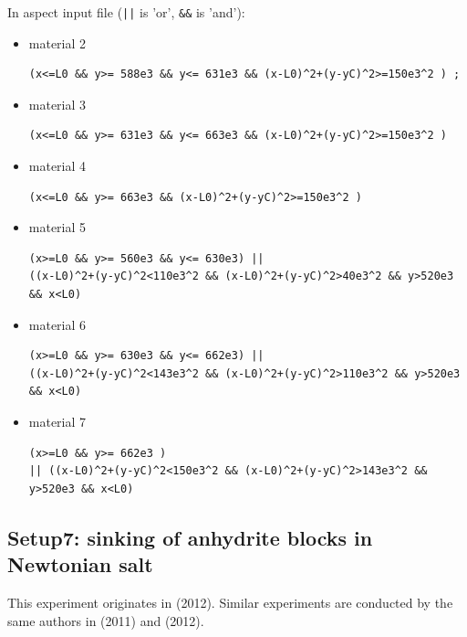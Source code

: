 In aspect input file ({\tt ||} is 'or', {\tt \&\&}  is 'and'):
\begin{itemize}
\item material 2
\begin{verbatim}
(x<=L0 && y>= 588e3 && y<= 631e3 && (x-L0)^2+(y-yC)^2>=150e3^2 ) ; 
\end{verbatim}
\item material 3
\begin{verbatim}
(x<=L0 && y>= 631e3 && y<= 663e3 && (x-L0)^2+(y-yC)^2>=150e3^2 ) 
\end{verbatim}
\item material 4
\begin{verbatim}
(x<=L0 && y>= 663e3 && (x-L0)^2+(y-yC)^2>=150e3^2 )
\end{verbatim}
\item material 5
\begin{verbatim}
(x>=L0 && y>= 560e3 && y<= 630e3) || 
((x-L0)^2+(y-yC)^2<110e3^2 && (x-L0)^2+(y-yC)^2>40e3^2 && y>520e3 && x<L0) 
\end{verbatim}
\item material 6
\begin{verbatim}
(x>=L0 && y>= 630e3 && y<= 662e3) || 
((x-L0)^2+(y-yC)^2<143e3^2 && (x-L0)^2+(y-yC)^2>110e3^2 && y>520e3 && x<L0) 
\end{verbatim}
\item material 7
\begin{verbatim}
(x>=L0 && y>= 662e3 )  
|| ((x-L0)^2+(y-yC)^2<150e3^2 && (x-L0)^2+(y-yC)^2>143e3^2 && y>520e3 && x<L0) 
\end{verbatim}
\end{itemize}

\subsection*{Setup7: sinking of anhydrite blocks in Newtonian salt}


This experiment originates in \textcite{buks12} (2012). 
Similar experiments are conducted by the same authors in \textcite{buks11} (2011)
and \textcite{buks12b} (2012).

